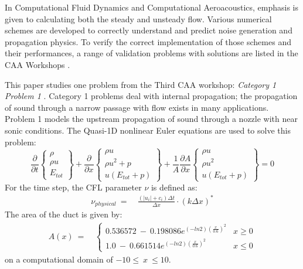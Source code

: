 \documentclass[conf]{new-aiaa}
\begin{document}
In Computational Fluid Dynamics and Computational Aeroacoustics, emphasis is given to calculating both the steady and unsteady flow. 
Various numerical schemes are developed to correctly understand and predict noise generation and propagation physics. 
To verify the correct implementation of those schemes and their performances, a range of validation problems with solutions are listed in the CAA Workshops \cite{CAA1, CAA2, CAA3}.

This paper studies one problem from the Third CAA workshop: \textit{Category 1 Problem 1} \cite{CAA3}. 
Category 1 problems deal with internal propagation; 
the propagation of sound through a narrow passage with flow exists in many applications. 
Problem 1 models the upstream propagation of sound through a nozzle with near sonic conditions. 
The Quasi-1D nonlinear Euler equations are used to solve this problem:
\begin{equation}
    \label{eq:Euler}
    \frac{\partial{}}{\partial{t}} 
    \begin{Bmatrix}
        \rho \\
        \rho{u} \\
        E_{tot}
  \end{Bmatrix}+\frac{\partial{}}{\partial{x}}
    \begin{Bmatrix}
        \rho{u} \\
        \rho{u^2}+p \\
        u(E_{tot}+p)
  \end{Bmatrix} +\frac{1}{A}\frac{\partial{A}}{\partial{x}}
    \begin{Bmatrix}
        \rho{u} \\
        \rho{u^2} \\
        u(E_{tot}+p)
  \end{Bmatrix}= 0
\end{equation}
For the time step, the CFL parameter $\nu$ is defined as:
\begin{equation}
	\begin{split}
		\label{eq:}
  			\nu_{physical}
  			~=&~\frac{\left(\left|u_i\right|+c_i\right)\Delta{t}}{\Delta{x}}\cdot\left(k\Delta{x}\right)^*
	\end{split}
\end{equation}
The area of the duct is given by:
\begin{equation}
	\begin{split}
		\label{eq:}
  			A(x)~=&~\left\{
  			\begin{matrix}
  				0.536572~-~0.198086e^{\left(-ln2\right)\left(\frac{x}{0.6}\right)^2} & x \geq 0 \\
  				1.0~-~0.661514e^{\left(-ln2\right)\left(\frac{x}{0.6}\right)^2} & x \leq 0
  			\end{matrix}
  			\right.
	\end{split}
\end{equation}
on a computational domain of $-10\leq~x~\leq10$. 
\end{document}
